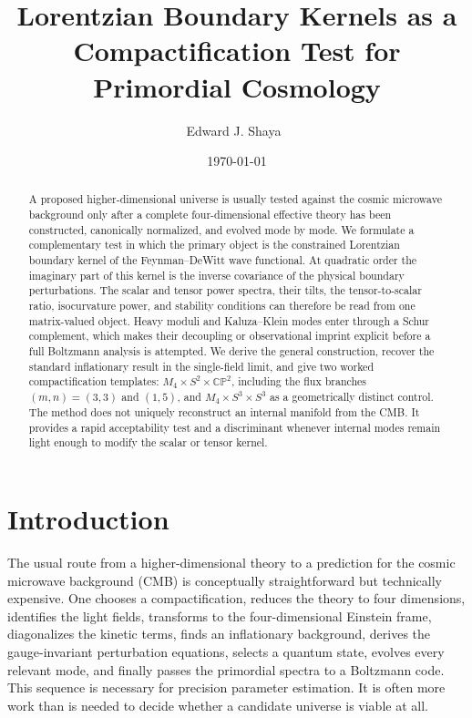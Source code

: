 \documentclass[aps,prd,twocolumn,superscriptaddress,nofootinbib,longbibliography]{revtex4-2}
\newcommand{\CP}{\mathbb{CP}}
\begin{document}
\title{Lorentzian Boundary Kernels as a Compactification Test for Primordial Cosmology}

\author{Edward J. Shaya\ }



\date{\today}

\begin{abstract}
A proposed higher-dimensional universe is usually tested against the cosmic microwave background only after a complete four-dimensional effective theory has been constructed, canonically normalized, and evolved mode by mode. We formulate a complementary test in which the primary object is the constrained Lorentzian boundary kernel of the Feynman--DeWitt wave functional. At quadratic order the imaginary part of this kernel is the inverse covariance of the physical boundary perturbations. The scalar and tensor power spectra, their tilts, the tensor-to-scalar ratio, isocurvature power, and stability conditions can therefore be read from one matrix-valued object. Heavy moduli and Kaluza--Klein modes enter through a Schur complement, which makes their decoupling or observational imprint explicit before a full Boltzmann analysis is attempted. We derive the general construction, recover the standard inflationary result in the single-field limit, and give two worked compactification templates: $M_4\times S^2 \times \CP^2$, including the flux branches $(m,n)=(3,3)$ and $(1,5)$, and $M_4 \times S^3\times S^3$ as a geometrically distinct control. The method does not uniquely reconstruct an internal manifold from the CMB. It provides a rapid acceptability test and a discriminant whenever internal modes remain light enough to modify the scalar or tensor kernel.
\end{abstract}

\maketitle

\section{Introduction}
The usual route from a higher-dimensional theory to a prediction for the cosmic microwave background (CMB) is conceptually straightforward but technically expensive. One chooses a compactification, reduces the theory to four dimensions, identifies the light fields, transforms to the four-dimensional Einstein frame, diagonalizes the kinetic terms, finds an inflationary background, derives the gauge-invariant perturbation equations, selects a quantum state, evolves every relevant mode, and finally passes the primordial spectra to a Boltzmann code. This sequence is necessary for precision parameter estimation. It is often more work than is needed to decide whether a candidate universe is viable at all.
\end{document}
